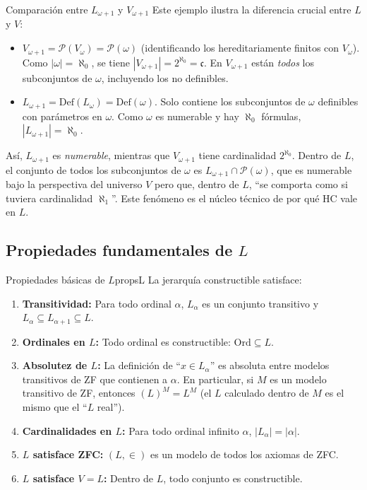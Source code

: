 \begin{ejemplo}{Comparación entre $L_{\omega+1}$ y $V_{\omega+1}$}{}
Este ejemplo ilustra la diferencia crucial entre $L$ y $V$:
\begin{itemize}[leftmargin=2em]
  \item $V_{\omega+1} = \mathcal{P}(V_\omega) = \mathcal{P}(\omega)$ (identificando los hereditariamente finitos con $V_\omega$). Como $|\omega| = \aleph_0$, se tiene $|V_{\omega+1}| = 2^{\aleph_0} = \mathfrak{c}$. En $V_{\omega+1}$ están \emph{todos} los subconjuntos de $\omega$, incluyendo los no definibles.
  \item $L_{\omega+1} = \mathrm{Def}(L_\omega) = \mathrm{Def}(\omega)$. Solo contiene los subconjuntos de $\omega$ definibles con parámetros en $\omega$. Como $\omega$ es numerable y hay $\aleph_0$ fórmulas, $|L_{\omega+1}| = \aleph_0$.
\end{itemize}
Así, $L_{\omega+1}$ es \emph{numerable}, mientras que $V_{\omega+1}$ tiene cardinalidad $2^{\aleph_0}$. Dentro de $L$, el conjunto de todos los subconjuntos de $\omega$ es $L_{\omega+1} \cap \mathcal{P}(\omega)$, que es numerable bajo la perspectiva del universo $V$ pero que, dentro de $L$, ``se comporta como si tuviera cardinalidad $\aleph_1$''. Este fenómeno es el núcleo técnico de por qué HC vale en $L$.
\end{ejemplo}

\subsection{Propiedades fundamentales de \texorpdfstring{$L$}{L}}

\begin{teorema}{Propiedades básicas de $L$}{propsL}
La jerarquía constructible satisface:
\begin{enumerate}[leftmargin=2em, label=(\alph*)]
  \item \textbf{Transitividad:} Para todo ordinal $\alpha$, $L_\alpha$ es un conjunto transitivo y $L_\alpha \subseteq L_{\alpha+1} \subseteq L$.
  \item \textbf{Ordinales en $L$:} Todo ordinal es constructible: $\mathrm{Ord} \subseteq L$.
  \item \textbf{Absolutez de $L$:} La definición de ``$x \in L_\alpha$'' es absoluta entre modelos transitivos de ZF que contienen a $\alpha$. En particular, si $M$ es un modelo transitivo de ZF, entonces $(L)^M = L^M$ (el $L$ calculado dentro de $M$ es el mismo que el ``$L$ real'').
  \item \textbf{Cardinalidades en $L$:} Para todo ordinal infinito $\alpha$, $|L_\alpha| = |\alpha|$.
  \item \textbf{$L$ satisface ZFC:} $(L, \in)$ es un modelo de todos los axiomas de ZFC.
  \item \textbf{$L$ satisface $V = L$:} Dentro de $L$, todo conjunto es constructible.
\end{enumerate}
\end{teorema}

